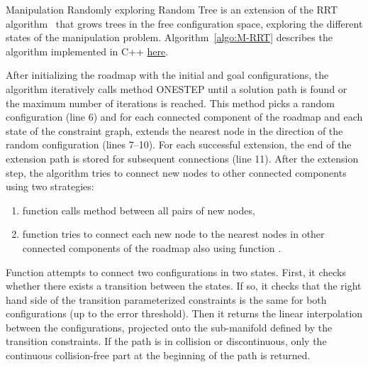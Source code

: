Manipulation Randomly exploring Random Tree is an extension of the RRT algorithm~\cite{LavKuf01b} that grows trees in the free configuration space, exploring the different states of the manipulation problem. Algorithm~\ref{algo:M-RRT} describes the algorithm implemented in C++ \href{https://github.com/humanoid-path-planner/hpp-manipulation/blob/16369aa291ab1b17ef6176ae8b8b2512b5e6fff7/src/manipulation-planner.cc\#L159}{here}.

After initializing the roadmap with the initial and goal configurations, the algorithm iteratively calls method {\scriptsize ONE}{\small S}{\scriptsize TEP} until a solution path is found or the maximum number of iterations is reached.
This method picks a random configuration (line 6) and for each connected component of the roadmap and each state of the constraint graph, extends the nearest node in the direction of the random configuration (lines 7--10). For each successful extension, the end of the extension path is stored for subsequent connections (line 11). After the extension step, the algorithm tries to connect new nodes to other connected components using two strategies:
\begin{enumerate}
\item function \TRYCONNECTNEWNODES calls method \CONNECT between all pairs of new nodes,
\item function \TRYCONNECTTOROADMAP tries to connect each new node to the nearest nodes in other connected components of the roadmap also using function \CONNECT.
\end{enumerate}
Function \CONNECT attempts to connect two configurations in two states. First, it checks whether there exists a transition between the states. If so, it checks that the right hand side of the transition parameterized constraints is the same for both configurations (up to the error threshold). Then it returns the linear interpolation between the configurations, projected onto the sub-manifold defined by the transition constraints. If the path is in collision {\color{blue}or discontinuous}, only the {\color{blue}continuous} collision-free part at the beginning of the path is returned.

